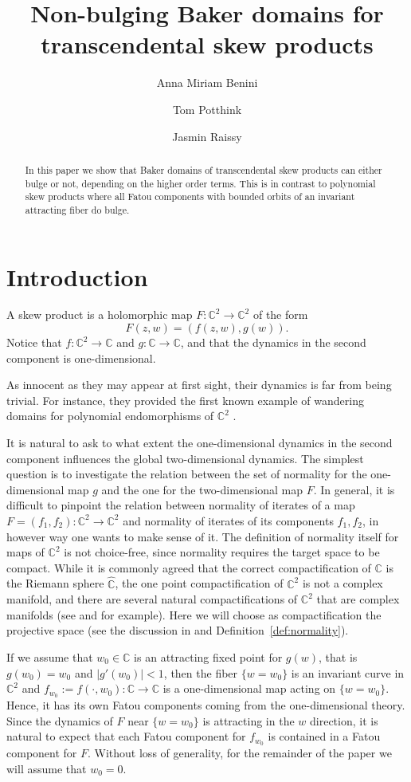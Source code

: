 \documentclass[a4paper, 12pt, twoside]{amsart}
\title[Non-bulging Baker domains for transcendental skew products]{Non-bulging Baker domains for transcendental skew products}
\author{Anna Miriam Benini}
\author{Tom Potthink}
\author{Jasmin Raissy}
\theoremstyle{definition}
\numberwithin{equation}{section}
\newcommand{\C}{{\mathbb C}}
\newcommand{\ra}{\rightarrow}
\begin{document}
\maketitle  
\begin{abstract}
In this paper we show that Baker domains of transcendental skew products can either bulge or not, depending on the higher order terms. This is in contrast to polynomial skew products where all Fatou components with bounded orbits of an invariant attracting fiber do bulge.
\end{abstract}

\section{Introduction}
A skew product is a holomorphic map $F:\C^2\ra\C^2$ of the form
\begin{equation}\label{eq:skew product}
F(z,w)=(f(z,w),g(w)).
\end{equation}
  Notice that $f:\C^2\to\C$ and $g:\C\to \C$, and that the dynamics in the second component is one-dimensional. 
  
  As innocent as they may appear at first sight, their dynamics is far from being trivial. For instance, they provided the first known example of wandering domains for polynomial endomorphisms of $\C^2$ \cite{ABDPR}. 
  
  It is natural to ask to what extent the one-dimensional dynamics in the second component influences the global two-dimensional dynamics. The simplest question is to investigate the relation between the set of normality for the one-dimensional map $g$ and the one for  the two-dimensional map $F$. 
 In general, it is difficult to pinpoint the relation between normality of iterates  of a map $F=(f_1,f_2):\C^2\ra\C^2$ and normality of iterates of its components $f_1, f_2$, in however way one wants to make sense of it. The definition of normality itself  for maps of $\C^2$ is not choice-free, since normality requires the target space to be compact. While it is commonly agreed  that the correct compactification of $\C$ is the Riemann sphere $\widehat{\C}$, the one point compactification of $\C^2$ is not a complex manifold, and there are several natural compactifications of $\C^2$ that are complex manifolds (see \cite{Morrow} and \cite{Brenton} for example). Here we will choose as compactification the projective space (see the discussion in \cite{ABFP2019} and Definition~\ref{def:normality}). 
  
  If we assume that $w_0\in\C$ is an attracting fixed point for $g(w)$, that is $g(w_0)=w_0$ and $|g'(w_0)|<1$, then the fiber $\{w=w_0\}$ is an invariant curve in $\C^2$ and  $f_{w_0}:=f(\cdot, w_0):\C\to\C$ is a one-dimensional map acting on $\{w=w_0\}$.  Hence, it has its own Fatou components coming from the one-dimensional theory. Since the dynamics of $F$ near $\{w=w_0\}$ is attracting in the $w$ direction, it is natural to expect that each Fatou component for $f_{w_0}$ is contained in a Fatou component for $F$. Without loss of generality, for the remainder of the paper we will assume that $w_0=0$. 
     
\end{document}
